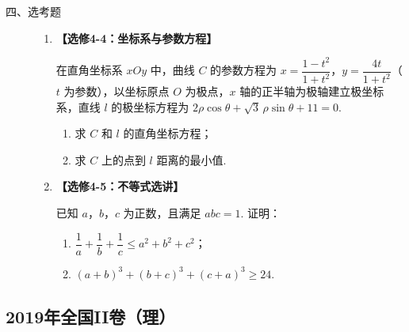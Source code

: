 \begin{description}

    \item[四、选考题]

    \begin{enumerate}[leftmargin=5pt]

      \addtocounter{enumi}{+21}

        \item \textbf{【选修4-4：坐标系与参数方程】}

在直角坐标系 \( xOy \) 中，曲线 \(C\) 的参数方程为 \( x=\dfrac{1-t^2}{1+t^2} \)，\( y=\dfrac{4t}{1+t^2} \)（\( t \) 为参数），以坐标原点 \(O\) 为极点，\( x \) 轴的正半轴为极轴建立极坐标系，直线 \( l \) 的极坐标方程为 \( 2\rho \cos \theta+\sqrt3\,\rho \sin \theta+11=0 \).

\begin{enumerate}
\item 求 \(C\) 和 \( l \) 的直角坐标方程；
\item 求 \(C\) 上的点到 \( l \) 距离的最小值.
\end{enumerate}

        \item \textbf{【选修4-5：不等式选讲】}

已知 \(a\)，\(b\)，\(c\) 为正数，且满足 \( abc=1 \). 证明：

\begin{enumerate}
\item \( \dfrac{1}{a}+\dfrac{1}{b}+\dfrac{1}{c}\le a^2+b^2+c^2 \)；
\item \( (a+b)^3+(b+c)^3+(c+a)^3\ge 24 \).
\end{enumerate}

    \end{enumerate}

\end{description}


\subsection{2019年全国II卷（理）}\label{gk:2019年全国II卷（理）}

